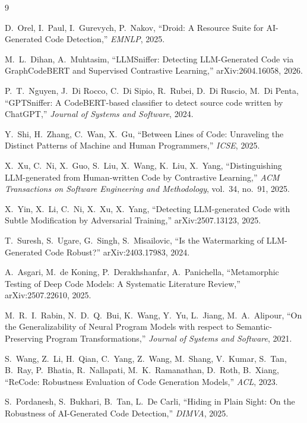 \documentclass[10pt,conference]{IEEEtran}
\begin{document}
\begin{thebibliography}{9}

 D.~Orel, I.~Paul, I.~Gurevych, P.~Nakov, ``Droid: A Resource Suite for AI-Generated Code Detection,'' \emph{EMNLP}, 2025.

 M.~L.~Dihan, A.~Muhtasim, ``LLMSniffer: Detecting LLM-Generated Code via GraphCodeBERT and Supervised Contrastive Learning,'' arXiv:2604.16058, 2026.

 P.~T.~Nguyen, J.~Di Rocco, C.~Di Sipio, R.~Rubei, D.~Di Ruscio, M.~Di Penta, ``GPTSniffer: A CodeBERT-based classifier to detect source code written by ChatGPT,'' \emph{Journal of Systems and Software}, 2024.

 Y.~Shi, H.~Zhang, C.~Wan, X.~Gu, ``Between Lines of Code: Unraveling the Distinct Patterns of Machine and Human Programmers,'' \emph{ICSE}, 2025.

 X.~Xu, C.~Ni, X.~Guo, S.~Liu, X.~Wang, K.~Liu, X.~Yang, ``Distinguishing LLM-generated from Human-written Code by Contrastive Learning,'' \emph{ACM Transactions on Software Engineering and Methodology}, vol.~34, no.~91, 2025.

 X.~Yin, X.~Li, C.~Ni, X.~Xu, X.~Yang, ``Detecting LLM-generated Code with Subtle Modification by Adversarial Training,'' arXiv:2507.13123, 2025.

 T.~Suresh, S.~Ugare, G.~Singh, S.~Misailovic, ``Is the Watermarking of LLM-Generated Code Robust?'' arXiv:2403.17983, 2024.

 A.~Asgari, M.~de Koning, P.~Derakhshanfar, A.~Panichella, ``Metamorphic Testing of Deep Code Models: A Systematic Literature Review,'' arXiv:2507.22610, 2025.

 M.~R.~I.~Rabin, N.~D.~Q.~Bui, K.~Wang, Y.~Yu, L.~Jiang, M.~A.~Alipour, ``On the Generalizability of Neural Program Models with respect to Semantic-Preserving Program Transformations,'' \emph{Journal of Systems and Software}, 2021.

 S.~Wang, Z.~Li, H.~Qian, C.~Yang, Z.~Wang, M.~Shang, V.~Kumar, S.~Tan, B.~Ray, P.~Bhatia, R.~Nallapati, M.~K.~Ramanathan, D.~Roth, B.~Xiang, ``ReCode: Robustness Evaluation of Code Generation Models,'' \emph{ACL}, 2023.

 S.~Pordanesh, S.~Bukhari, B.~Tan, L.~De Carli, ``Hiding in Plain Sight: On the Robustness of AI-Generated Code Detection,'' \emph{DIMVA}, 2025.


\end{thebibliography}
\end{document}
